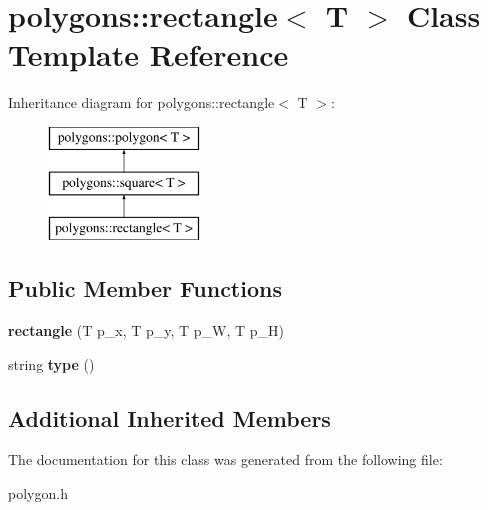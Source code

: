 \hypertarget{classpolygons_1_1rectangle}{\section{polygons\-:\-:rectangle$<$ T $>$ Class Template Reference}
\label{classpolygons_1_1rectangle}
}
Inheritance diagram for polygons\-:\-:rectangle$<$ T $>$\-:\begin{figure}[H]
\begin{center}
\leavevmode
\includegraphics[height=3.000000cm]{classpolygons_1_1rectangle}
\end{center}
\end{figure}
\subsection*{Public Member Functions}
\begin{DoxyCompactItemize}
\item 
\hypertarget{classpolygons_1_1rectangle_a41ebba3925afeb3bf73b836c41089bb2}{{\bfseries rectangle} (T p\-\_\-x, T p\-\_\-y, T p\-\_\-\-W, T p\-\_\-\-H)}\label{classpolygons_1_1rectangle_a41ebba3925afeb3bf73b836c41089bb2}

\item 
\hypertarget{classpolygons_1_1rectangle_a92e64e9f8e05bfd15fdfd2e24be93ae9}{string {\bfseries type} ()}\label{classpolygons_1_1rectangle_a92e64e9f8e05bfd15fdfd2e24be93ae9}

\end{DoxyCompactItemize}
\subsection*{Additional Inherited Members}


The documentation for this class was generated from the following file\-:\begin{DoxyCompactItemize}
\item 
polygon.\-h\end{DoxyCompactItemize}
